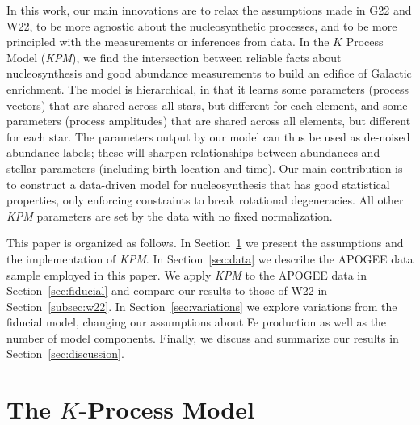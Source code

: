 \documentclass[modern]{aastex631}
\newcommand{\name}{\textsl{KPM}}
\begin{document}
In this work, our main innovations are to relax the assumptions made in G22 and W22, to be more agnostic about the nucleosynthetic processes, and to be more principled with the measurements or inferences from data.
In the $K$ Process Model (\name{}), we find the intersection between reliable facts about nucleosynthesis and good abundance measurements to build an edifice of Galactic enrichment.
The model is hierarchical, in that it learns some parameters (process vectors) that are shared across all stars, but different for each element, and some parameters (process amplitudes) that are shared across all elements, but different for each star.
The parameters output by our model can thus be used as de-noised abundance labels; these will sharpen relationships between abundances and stellar parameters (including birth location and time). Our main contribution is to construct a data-driven model for nucleosynthesis that has good statistical properties, only enforcing constraints to break rotational degeneracies. All other \name{} parameters are set by the data with no fixed normalization.

This paper is organized as follows. In Section~\ref{sec:model} we present the assumptions and the implementation of \name{}. In Section~\ref{sec:data} we describe the APOGEE data sample employed in this paper.  We apply \name{} to the APOGEE data in Section~\ref{sec:fiducial} and compare our results to those of W22 in Section~\ref{subsec:w22}. In Section~\ref{sec:variations} we explore variations from the fiducial model, changing our assumptions about Fe production as well as the number of model components. Finally, we discuss and summarize our results in Section~\ref{sec:discussion}.

\section{The $K$-Process Model}\label{sec:model}
\end{document}
